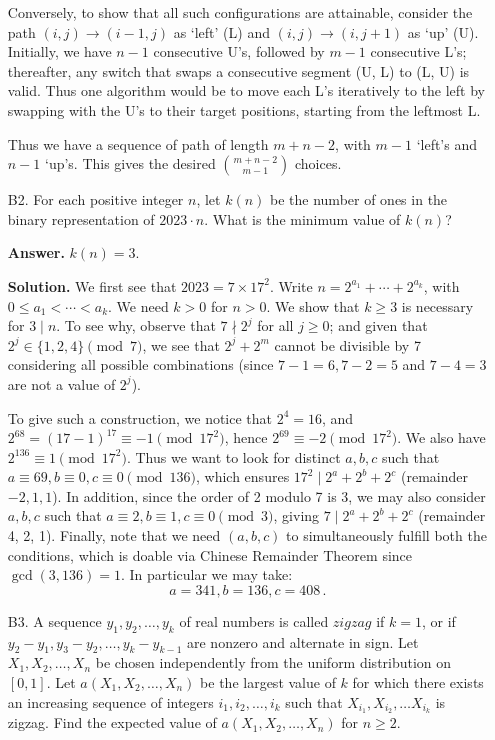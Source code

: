 \documentclass[11pt,a4paper]{article}
\begin{document}
\begin{enumerate}
	    Conversely, to show that all such configurations are attainable, 
	    consider the path $(i, j)\to (i - 1, j)$ as `left' (L) and $(i, j)\to (i, j + 1)$ as `up' (U). 
	    Initially, we have $n - 1$ consecutive U's, followed by $m - 1$ consecutive L's; 
	    thereafter, any switch that swaps a consecutive segment (U, L) to (L, U) is valid. 
	    Thus one algorithm would be to move each L's iteratively to the left by swapping with the U's to their target positions, 
	    starting from the leftmost L. 
	    
	    Thus we have a sequence of path of length $m + n - 2$, with $m - 1$ `left's and $n - 1$ `up's. 
	    This gives the desired $\binom{m + n - 2}{m - 1}$ choices. 
		
		\item [B2.]
		For each positive integer $n$, let $k(n)$ be the number of ones in the binary representation of $2023 \cdot n$. What is the minimum value of $k(n)$?
		
		\textbf{Answer.} $k(n) = 3$. 
		
		\textbf{Solution.} 
		We first see that $2023 = 7\times 17^2$. 
		Write $n = 2^{a_1}+\cdots + 2^{a_k}$, with $0\le a_1 < \cdots < a_k$. 
		We need $k > 0$ for $n > 0$. 
		We show that $k\ge 3$ is necessary for $3\mid n$. 
		To see why, observe that $7\nmid 2^{j}$ for all $j\ge 0$; 
		and given that $2^j\in \{1, 2, 4\}\pmod{7}$, 
		we see that $2^j+2^m$ cannot be divisible by 7 considering all possible combinations 
		(since $7-1=6, 7-2=5$ and $7-4=3$ are not a value of $2^j$). 
		
		To give such a construction, we notice that $2^4 = 16$, 
		and $2^{68} = (17-1)^{17} \equiv -1\pmod{17^2}$, 
		hence $2^{69}\equiv -2\pmod{17^2}$. 
		We also have $2^{136}\equiv 1\pmod{17^2}$. 
		Thus we want to look for distinct $a, b, c$ such that $a\equiv 69, b\equiv 0, c\equiv 0\pmod{136}$, 
		which ensures $17^2\mid 2^a+2^b+2^c$ (remainder $-2, 1, 1$). 
		In addition, since the order of 2 modulo 7 is 3, 
		we may also consider $a, b, c$ such that $a\equiv 2, b\equiv 1, c\equiv 0\pmod{3}$, 
		giving $7\mid 2^a+2^b+2^c$ (remainder 4, 2, 1). 
		Finally, note that we need $(a, b, c)$ to simultaneously fulfill both the conditions, 
		which is doable via Chinese Remainder Theorem since $\gcd(3, 136)=1$. 
		In particular we may take: 
		\[
		a=341, b=136, c = 408\,.
		\]
		
		\item [B3.]
		A sequence $y_1, y_2, \ldots, y_k$ of real numbers is called $\textit{zigzag}$ if $k=1$, or if $y_2-y_1, y_3-y_2, \ldots, y_k-y_{k-1}$ are nonzero and alternate in sign. Let $X_1, X_2, \ldots, X_n$ be chosen independently from the uniform distribution on $[0,1]$. Let $a\left(X_1, X_2, \ldots, X_n\right)$ be the largest value of $k$ for which there exists an increasing sequence of integers $i_1, i_2, \ldots, i_k$ such that $X_{i_1}, X_{i_2}, \ldots X_{i_k}$ is zigzag. Find the expected value of $a\left(X_1, X_2, \ldots, X_n\right)$ for $n \geq 2$.
		

\end{enumerate}
\end{document}
